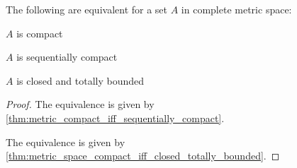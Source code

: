 \begin{corollary}\label{thm:complete_metric_space_compact_conditions}
  The following are equivalent for a set \( A \) in complete metric space:
  \begin{defenum}
    \item\label{thm:complete_metric_space_compact_conditions/compact} \( A \) is compact
    \item\label{thm:complete_metric_space_compact_conditions/sequentially_compact} \( A \) is sequentially compact
    \item\label{thm:complete_metric_space_compact_conditions/closed_totally_bounded} \( A \) is closed and totally bounded
  \end{defenum}
\end{corollary}
\begin{proof}
   The equivalence is given by \cref{thm:metric_compact_iff_sequentially_compact}.

   The equivalence is given by \cref{thm:metric_space_compact_iff_closed_totally_bounded}.
\end{proof}
